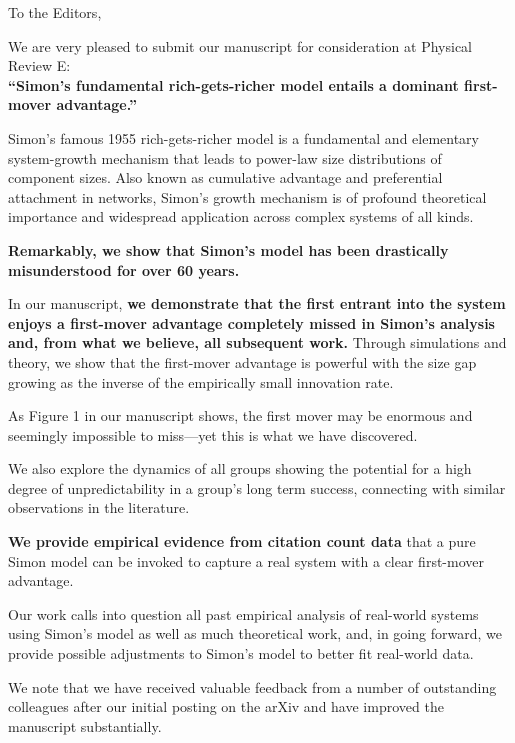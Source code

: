 
To the Editors,

We are very pleased to submit our manuscript for consideration at
Physical Review E:\\
\textbf{``Simon's fundamental rich-gets-richer model entails a dominant first-mover advantage.''}

Simon's famous 1955 rich-gets-richer model is a fundamental
and elementary system-growth mechanism that leads to power-law 
size distributions of component sizes.  
Also known as cumulative advantage and preferential attachment in networks,
Simon's growth mechanism is of profound theoretical importance and widespread
application across complex systems of all kinds.

\textbf{Remarkably, we show that Simon's model has
been drastically misunderstood for over 60 years.}

In our manuscript, 
\textbf{we demonstrate that the first entrant into the system enjoys a first-mover advantage
completely missed in Simon's analysis and, from what we believe, all subsequent
work.}  Through simulations and theory, we show that 
the first-mover advantage is powerful with the size gap
growing as the inverse of the empirically small innovation rate.

As Figure 1 in our manuscript shows, the first mover may be
enormous and seemingly impossible to miss---yet this is what we
have discovered.

We also explore the dynamics of all groups showing the potential
for a high degree of unpredictability in a group's long term success,
connecting with similar observations in the literature.

\textbf{We provide empirical evidence from citation count data} that a pure Simon model
can be invoked to capture a real system with a clear first-mover advantage.

Our work calls into question all past empirical analysis of real-world
systems
using Simon's model
as well as much theoretical work,
and, in going forward, we provide possible adjustments to Simon's model to
better fit real-world data.

We note that we have received valuable feedback from a number of outstanding colleagues
after our initial posting on the arXiv and have improved the manuscript
substantially.

